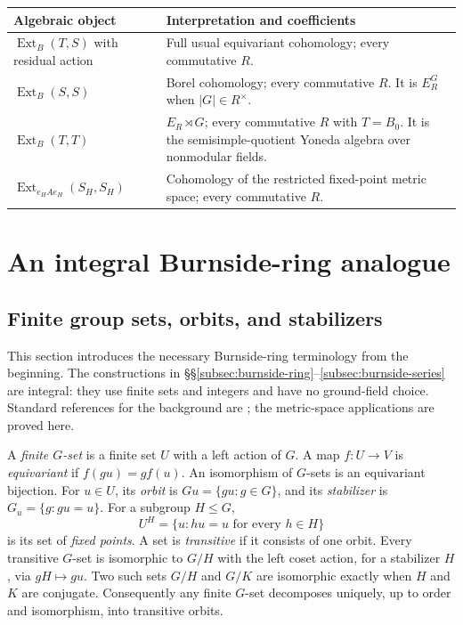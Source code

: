 \documentclass[11pt,a4paper]{article}
\newcommand{\defn}[1]{\textsl{\color{darkblue} #1}}
\numberwithin{equation}{section}
\theoremstyle{definition}
\theoremstyle{remark}
\newcommand{\G}{G}
\newcommand{\Ext}{\operatorname{Ext}}
\begin{document}
\begin{center}
\begin{tabular}{@{}p{}p{}@{}}
\toprule
Algebraic object & Interpretation and coefficients\\
\midrule
$\Ext_B(T,S)$ with residual action & Full usual equivariant
cohomology; every commutative $R$.\\[3pt]
$\Ext_B(S,S)$ & Borel cohomology; every commutative $R$.  It is
$E_R^\G$ when $|\G|\in R^\times$.\\[3pt]
$\Ext_B(T,T)$ & $E_R\rtimes\G$; every commutative $R$ with $T=B_0$.
It is the semisimple-quotient Yoneda algebra over nonmodular fields.\\[3pt]
$\Ext_{e_HAe_H}(S_H,S_H)$ & Cohomology of the restricted fixed-point
metric space; every commutative $R$.\\
\bottomrule
\end{tabular}
\end{center}

\section{An integral Burnside-ring analogue}
\label{sec:burnside}

\subsection{Finite group sets, orbits, and stabilizers}

This section introduces the necessary Burnside-ring terminology from
the beginning.  The constructions in
\S\S\ref{subsec:burnside-ring}--\ref{subsec:burnside-series} are
integral: they use finite sets and integers and have no ground-field
choice.  Standard references for the background are
\cite[\S\S2--3]{Bouc}; the metric-space applications are proved here.

A \defn{finite $\G$-set} is a finite set $U$ with a left action of
$\G$.  A map $f:U\to V$ is \defn{equivariant} if $f(gu)=gf(u)$.
An isomorphism of $\G$-sets is an equivariant bijection.  For $u\in U$,
its \defn{orbit} is $\G u=\{gu:g\in\G\}$, and its
\defn{stabilizer} is $\G_u=\{g:gu=u\}$.  For a subgroup $H\leq\G$,
\[
 U^H=\{u:hu=u\text{ for every }h\in H\}
\]
is its set of \defn{fixed points}.  A set is \defn{transitive} if it consists
of one orbit.  Every transitive $\G$-set is isomorphic to $\G/H$ with
the left coset action, for a stabilizer $H$, via $gH\mapsto gu$.
Two such sets $\G/H$ and $\G/K$ are isomorphic exactly when $H$ and
$K$ are conjugate.  Consequently any finite $\G$-set decomposes
uniquely, up to order and isomorphism, into transitive orbits.
\end{document}
